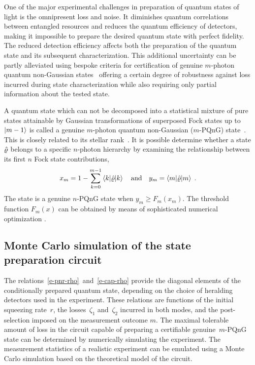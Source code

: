 \documentclass{article}
\begin{document}
One of the major experimental challenges in preparation of quantum states of light is the omnipresent loss and noise. It diminishes quantum correlations between entangled resources and reduces the quantum efficiency of detectors, making it impossible to prepare the desired quantum state with perfect fidelity. The reduced detection efficiency affects both the preparation of the quantum state and its subsequent characterization. This additional uncertainty can be partly alleviated using bespoke criteria for certification of genuine $m$-photon quantum non-Gaussian states~\cite{lachman2019} offering a certain degree of robustness against loss incurred during state characterization while also requiring only partial information about the tested state.

A quantum state which can not be decomposed into a statistical mixture of pure states attainable by Gaussian transformations of superposed Fock states up to ${\ket{m - 1}}$ is called a genuine $m$-photon quantum non-Gaussian ($m$-PQnG) state~\cite{lachman2019}. This is closely related to its stellar rank~\cite{chabaud2020,fiurasek2022}. It is possible determine whether a state $\hat{\varrho}$ belongs to a specific $n$-photon hierarchy by examining the relationship between its first $n$ Fock state contributions,
%
\begin{equation}
  x_{m} 
    = 1 - \sum_{k = 0}^{m - 1} 
      \braket{k | \hat{\varrho} | k}
  \quad\text{and}\quad
  y_{m} = \braket{m | \hat{\varrho} | m}
  \;\text{.}
\end{equation}
%
The state is a genuine $n$-PQnG state when ${y_{m} \geq F_{m} (x_{m})}$. The threshold function $F_{m}(x)$ can be obtained by means of sophisticated numerical optimization \cite{lachman2019,fiurasek2022}.

%
%

\subsection*{Monte Carlo simulation of the state preparation circuit}

The relations~\eqref{e-pnr-rho}~and~\eqref{e-cap-rho} provide the diagonal elements of the conditionally prepared quantum state, depending on the choice of heralding detectors used in the experiment. These relations are functions of the initial squeezing rate~$r$, the losses~$\zeta_{1}$ and~$\zeta_{2}$ incurred in both modes, and the post-selection imposed on the measurement outcome $m$. The maximal tolerable amount of loss in the circuit capable of preparing a certifiable genuine~$m$-PQnG state can be determined by numerically simulating the experiment. The measurement statistics of a realistic experiment can be emulated using a Monte Carlo simulation based on the theoretical model of the circuit. 
\end{document}
